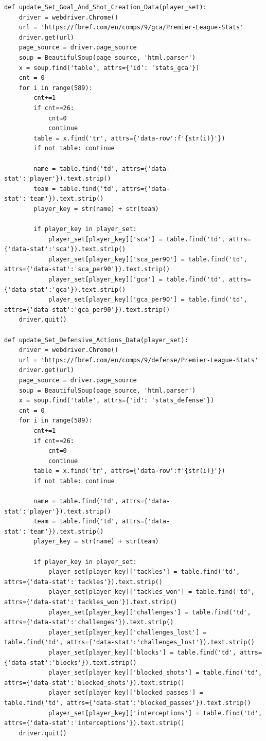 \documentclass[12pt]{report}
\begin{document}
{\begin{lstlisting}
def update_Set_Goal_And_Shot_Creation_Data(player_set):
    driver = webdriver.Chrome()
    url = 'https://fbref.com/en/comps/9/gca/Premier-League-Stats'
    driver.get(url)
    page_source = driver.page_source
    soup = BeautifulSoup(page_source, 'html.parser')
    x = soup.find('table', attrs={'id': 'stats_gca'})
    cnt = 0
    for i in range(589):
        cnt+=1
        if cnt==26:
            cnt=0
            continue
        table = x.find('tr', attrs={'data-row':f'{str(i)}'})
        if not table: continue

        name = table.find('td', attrs={'data-stat':'player'}).text.strip()
        team = table.find('td', attrs={'data-stat':'team'}).text.strip()
        player_key = str(name) + str(team)

        if player_key in player_set:
            player_set[player_key]['sca'] = table.find('td', attrs={'data-stat':'sca'}).text.strip()
            player_set[player_key]['sca_per90'] = table.find('td', attrs={'data-stat':'sca_per90'}).text.strip()
            player_set[player_key]['gca'] = table.find('td', attrs={'data-stat':'gca'}).text.strip()
            player_set[player_key]['gca_per90'] = table.find('td', attrs={'data-stat':'gca_per90'}).text.strip()
    driver.quit()

def update_Set_Defensive_Actions_Data(player_set):
    driver = webdriver.Chrome()
    url = 'https://fbref.com/en/comps/9/defense/Premier-League-Stats'
    driver.get(url)
    page_source = driver.page_source
    soup = BeautifulSoup(page_source, 'html.parser')
    x = soup.find('table', attrs={'id': 'stats_defense'})
    cnt = 0
    for i in range(589):
        cnt+=1
        if cnt==26:
            cnt=0
            continue
        table = x.find('tr', attrs={'data-row':f'{str(i)}'})
        if not table: continue

        name = table.find('td', attrs={'data-stat':'player'}).text.strip()
        team = table.find('td', attrs={'data-stat':'team'}).text.strip()
        player_key = str(name) + str(team)

        if player_key in player_set:
            player_set[player_key]['tackles'] = table.find('td', attrs={'data-stat':'tackles'}).text.strip()
            player_set[player_key]['tackles_won'] = table.find('td', attrs={'data-stat':'tackles_won'}).text.strip()
            player_set[player_key]['challenges'] = table.find('td', attrs={'data-stat':'challenges'}).text.strip()
            player_set[player_key]['challenges_lost'] = table.find('td', attrs={'data-stat':'challenges_lost'}).text.strip()
            player_set[player_key]['blocks'] = table.find('td', attrs={'data-stat':'blocks'}).text.strip()
            player_set[player_key]['blocked_shots'] = table.find('td', attrs={'data-stat':'blocked_shots'}).text.strip()
            player_set[player_key]['blocked_passes'] = table.find('td', attrs={'data-stat':'blocked_passes'}).text.strip()
            player_set[player_key]['interceptions'] = table.find('td', attrs={'data-stat':'interceptions'}).text.strip()
    driver.quit()


\end{lstlisting}}
\end{document}
